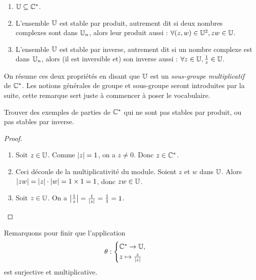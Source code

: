 \begin{proposition}
\begin{enumerate}
\item $\mathbb{U} \subseteq \mathbb{C}^*$.
\item L'ensemble $\mathbb{U}$ est stable par produit, autrement dit si deux nombres complexes sont dans $\mathbb{U}_n$, alors leur produit aussi : $\forall (z,w)\in\mathbb{U}^2, zw\in\mathbb{U}$.
\item L'ensemble $\mathbb{U}$ est stable par inverse, autrement dit si un nombre complexe est dans $\mathbb{U}_n$, alors (il est inversible et) son inverse aussi : $\forall z\in\mathbb{U}, \frac{1}{z} \in\mathbb{U}$.
\end{enumerate}
\end{proposition}
\begin{remarque}
On résume ces deux propriétés en disant que $\mathbb{U}$ est un \emph{sous-groupe multiplicatif} de $\mathbb{C}^*$. Les notions générales de groupe et sous-groupe seront introduites par la suite, cette remarque sert juste à commencer à poser le vocabulaire.
\end{remarque}
\begin{exo}
Trouver des exemples de parties de $\mathbb{C}^*$ qui ne sont pas stables par produit, ou pas stables par inverse.
\end{exo}
\begin{proof}
\begin{enumerate}
\item Soit $z\in\mathbb{U}$. Comme $\left\lvert z\right\rvert=1$, on a $z\neq 0$. Donc $z\in\mathbb{C}^*$.
\item Ceci découle de la multiplicativité du module. Soient $z$ et $w$ dans $\mathbb{U}$. Alors $\left\lvert zw\right\rvert = \left\lvert z\right\rvert \cdot \left\lvert w\right\rvert = 1\times 1 = 1$, donc $zw\in\mathbb{U}$.
\item Soit $z\in\mathbb{U}$. On a $\left\lvert\frac1z\right\rvert = \frac{1}{\left\lvert z\right\rvert} = \frac11=1$.
\end{enumerate}
\end{proof}



Remarquons pour finir que l'application
\[ \theta : \begin{cases}\mathbb{C}^* \to \mathbb{U},\\ z\mapsto \frac{z}{|z|}\end{cases}\]
est surjective et multiplicative.
